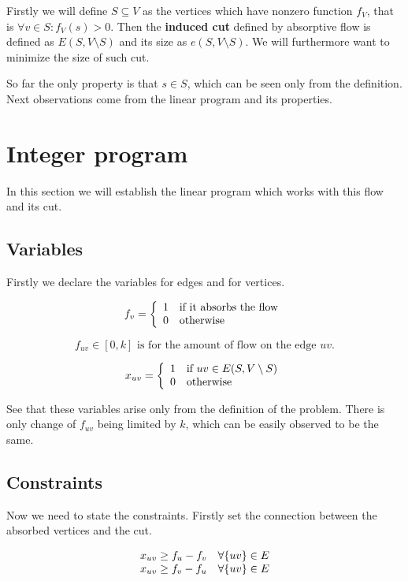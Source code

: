 \documentclass{article}
\theoremstyle{plain}
\theoremstyle{plain}
\theoremstyle{remark}
\begin{document}
	Firstly we will define $S \subseteq V$ as the vertices which have nonzero function $f_V$, that is $\forall v \in S : f_V(s) > 0$. Then the \textbf{induced cut} defined by absorptive flow is defined as $E(S, V \setminus S)$ and its size as $e(S, V \setminus S)$. We will furthermore want to minimize the size of such cut.
	
	So far the only property is that $s \in S$, which can be seen only from the definition. Next observations come from the linear program and its properties.
	
	
	\section{Integer program}
	
	In this section we will establish the linear program which works with this flow and its cut.
	
	\subsection{Variables}
	
	Firstly we declare the variables for edges and for vertices.
	
	$$
	f_v = \left\{\begin{array}{l l}
		1 & \text{if it absorbs the flow} \\
		0 & \text{otherwise}
	\end{array}
	\right.
	$$
	
	$$
	f_{uv} \in [0,k] \text{ is for the amount of flow on the edge } uv.
	$$
	
	$$
	x_{uv} = \left\{\begin{array}{l l}
		1 & \text{if } uv \in E(S, V \setminus S)\\
		0 & \text{otherwise}
	\end{array}
	\right.
	$$
	
	See that these variables arise only from the definition of the problem. There is only change of $f_{uv}$ being limited by $k$, which can be easily observed to be the same.
	
	\subsection{Constraints}
	
	Now we need to state the constraints. Firstly set the connection between the absorbed vertices and the cut.
	
	$$
	\begin{array}{r l}
		x_{uv} \geq f_u - f_v & \forall \{uv\} \in E\\
		x_{uv} \geq f_v - f_u & \forall \{uv\} \in E
	\end{array}
	$$
	
\end{document}
